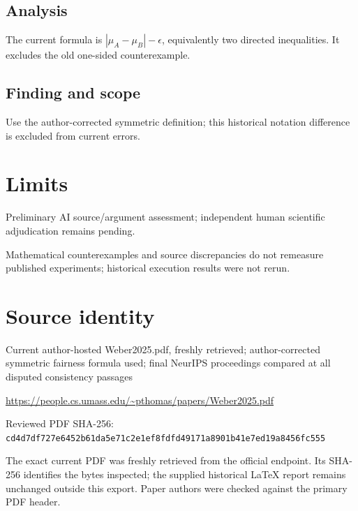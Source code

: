 \documentclass[11pt]{article}
\begin{document}
\subsection*{Analysis}

The current formula is \(|\mu_A-\mu_B|-\epsilon\), equivalently two directed inequalities. It excludes the old one-sided counterexample.

\subsection*{Finding and scope}

Use the author-corrected symmetric definition; this historical notation difference is excluded from current errors.

\section*{Limits}

Preliminary AI source/argument assessment; independent human scientific adjudication remains pending.\par

Mathematical counterexamples and source discrepancies do not remeasure published experiments; historical execution results were not rerun.\par

\section*{Source identity}

Current author-hosted Weber2025.pdf, freshly retrieved; author-corrected symmetric fairness formula used; final NeurIPS proceedings compared at all disputed consistency passages

\url{https://people.cs.umass.edu/~pthomas/papers/Weber2025.pdf}

Reviewed PDF SHA-256: \nolinkurl{cd4d7df727e6452b61da5e71c2e1ef8fdfd49171a8901b41e7ed19a8456fc555}

The exact current PDF was freshly retrieved from the official endpoint. Its SHA-256 identifies the bytes inspected; the supplied historical LaTeX report remains unchanged outside this export. Paper authors were checked against the primary PDF header.
\end{document}
